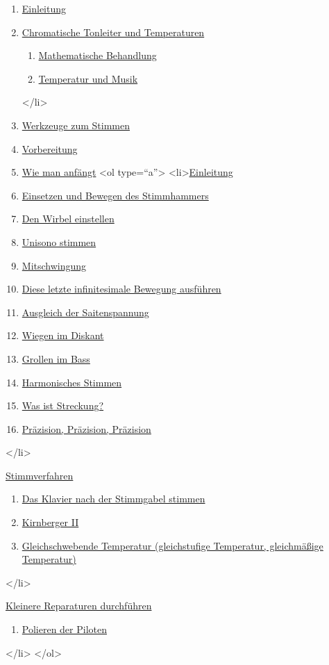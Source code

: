 \begin{enumerate} 
 \item \hyperref[c2_1]{Einleitung}
 \item \hyperref[c2_2]{Chromatische Tonleiter und Temperaturen}
  \begin{enumerate}[label={\alph*.}] 
   <li>\hyperref[c2_2a]{Einleitung}
   \item \hyperref[c2_2b]{Mathematische Behandlung}
   \item \hyperref[c2_2c]{Temperatur und Musik}
  \end{enumerate}
 </li>
 \item \hyperref[c2_3]{Werkzeuge zum Stimmen}
 \item \hyperref[c2_4]{Vorbereitung}
 \item \hyperref[c2_5]{Wie man anfängt}
  <ol type=\enquote{a}>
   <li>\hyperref[c2_5a]{Einleitung}
   \item \hyperref[c2_5_hamm]{Einsetzen und Bewegen des Stimmhammers}
   \item \hyperref[c2_5_wirb]{Den Wirbel einstellen}
   \item \hyperref[c2_5_unis]{Unisono stimmen}
   \item \hyperref[c2_5_mits]{Mitschwingung}
   \item \hyperref[c2_5_infi]{Diese letzte infinitesimale Bewegung ausführen}
   \item \hyperref[c2_5_span]{Ausgleich der Saitenspannung}
   \item \hyperref[c2_5_disk]{Wiegen im Diskant}
   \item \hyperref[c2_5_bass]{Grollen im Bass}
   \item \hyperref[c2_5_harm]{Harmonisches Stimmen}
   \item \hyperref[c2_5_stre]{Was ist Streckung?}
   \item \hyperref[c2_5_prae]{Präzision, Präzision, Präzision}
   \end{enumerate}
 </li>
 \item \hyperref[c2_6]{Stimmverfahren}
  \begin{enumerate}[label={\alph*.}] 
   <li>\hyperref[c2_6a]{Einleitung}
   \item \hyperref[c2_6_gabe]{Das Klavier nach der Stimmgabel stimmen}
   \item \hyperref[c2_6_kirn]{Kirnberger II}
   \item \hyperref[c2_6_et]{Gleichschwebende Temperatur (gleichstufige Temperatur, gleichmäßige Temperatur)}
   \end{enumerate}
 </li>
 \item \hyperref[c2_7]{Kleinere Reparaturen durchführen}
  \begin{enumerate}[label={\alph*.}] 
   <li>\hyperref[c2_7_hamm]{Intonieren der Hämmer}
   \item \hyperref[c2_7_pilo]{Polieren der Piloten}
   \end{enumerate}
 </li>
</ol> 

